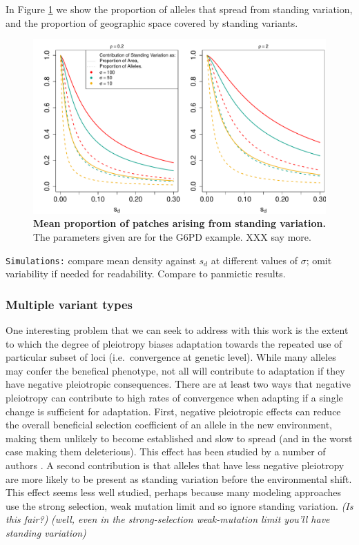 \documentclass{article}
\newcommand{\gc}[1]{{\it\color{green}(#1)} }
\newcommand{\plr}[1]{{\it\color{blue}(#1)}}
\begin{document}
In Figure \ref{G6PD_standing_var_proportion} we show the proportion of
alleles that spread from standing variation, and the proportion of
geographic space covered by standing variants. 

\begin{figure}[ht]
\begin{center}
  \includegraphics[width=1.0\textwidth]{G6PD_standing_var_proportion}
\caption{ %
{\bf Mean proportion of patches arising from standing variation.} The parameters given are for the G6PD example.  XXX say more.
} \label{G6PD_standing_var_proportion}
\end{center}
\end{figure}


{\tt Simulations:} 
compare mean density against $s_d$ at different values of $\sigma$; 
omit variability if needed for readability. 
Compare to panmictic results.


\subsubsection{Multiple variant types}

One interesting problem that we can seek to address with this work is
the extent to which the degree of pleiotropy biases 
adaptation towards the repeated use of particular subset of loci
(i.e.\ convergence at genetic level). 
While many alleles may confer the benefical phenotype, 
not all will contribute to adaptation if they have negative pleiotropic consequences.
There are at least two ways that negative pleiotropy can contribute to high rates of convergence 
when adapting if a single change is sufficient for adaptation. 
First, negative pleiotropic effects can reduce 
the overall beneficial selection coefficient of an allele in the new environment,
making them unlikely to become established and slow to spread 
(and in the worst case making them deleterious). 
This effect has been studied by a number of authors \citep{}. 
A second contribution is that alleles that have
less negative pleiotropy are more likely to be present as standing variation 
before the environmental shift.
This effect seems less well studied, 
perhaps because many modeling approaches use the strong selection, weak mutation limit 
and so ignore standing variation. \gc{Is this fair?}
\plr{well, even in the strong-selection weak-mutation limit you'll have standing variation}
\end{document}
